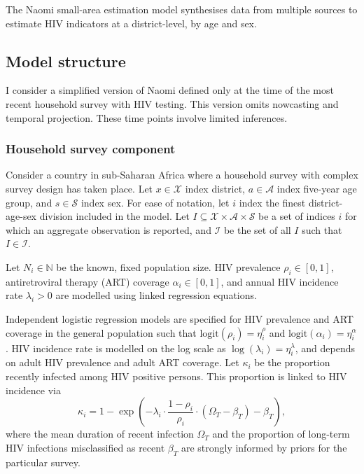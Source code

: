 \documentclass[a4paper, nobind]{templates/ociamthesis}
\begin{document}
The Naomi small-area estimation model \autocite{eaton2021naomi} synthesises data from multiple sources to estimate HIV indicators at a district-level, by age and sex.

\hypertarget{model-structure}{%
\subsection{Model structure}\label{model-structure}}

I consider a simplified version of Naomi defined only at the time of the most recent household survey with HIV testing.
This version omits nowcasting and temporal projection.
These time points involve limited inferences.

\hypertarget{household-survey-component}{%
\subsubsection{\texorpdfstring{Household survey component \label{sec:household}}{Household survey component }}\label{household-survey-component}}

Consider a country in sub-Saharan Africa where a household survey with complex survey design has taken place.
Let \(x \in \mathcal{X}\) index district, \(a \in \mathcal{A}\) index five-year age group, and \(s \in \mathcal{S}\) index sex.
For ease of notation, let \(i\) index the finest district-age-sex division included in the model.
Let \(I \subseteq \mathcal{X} \times \mathcal{A} \times \mathcal{S}\) be a set of indices \(i\) for which an aggregate observation is reported, and \(\mathcal{I}\) be the set of all \(I\) such that \(I \in \mathcal{I}\).

Let \(N_i \in \mathbb{N}\) be the known, fixed population size.
HIV prevalence \(\rho_i \in [0, 1]\), antiretroviral therapy (ART) coverage \(\alpha_i \in [0, 1]\), and annual HIV incidence rate \(\lambda_i > 0\) are modelled using linked regression equations.

Independent logistic regression models are specified for HIV prevalence and ART coverage in the general population such that \(\text{logit}(\rho_i) = \eta^\rho_i\) and \(\text{logit}(\alpha_i) = \eta^\alpha_i\).
HIV incidence rate is modelled on the log scale as \(\log(\lambda_i) = \eta^\lambda_i\), and depends on adult HIV prevalence and adult ART coverage.
Let \(\kappa_i\) be the proportion recently infected among HIV positive persons.
This proportion is linked to HIV incidence via
\begin{equation}
\kappa_i = 1- \exp \left( - \lambda_i \cdot \frac{1 - \rho_i}{\rho_i} \cdot (\Omega_T - \beta_T) - \beta_T \right), \label{eq:kappa}
\end{equation}
where the mean duration of recent infection \(\Omega_T\) and the proportion of long-term HIV infections misclassified as recent \(\beta_T\) are strongly informed by priors for the particular survey.
\end{document}
